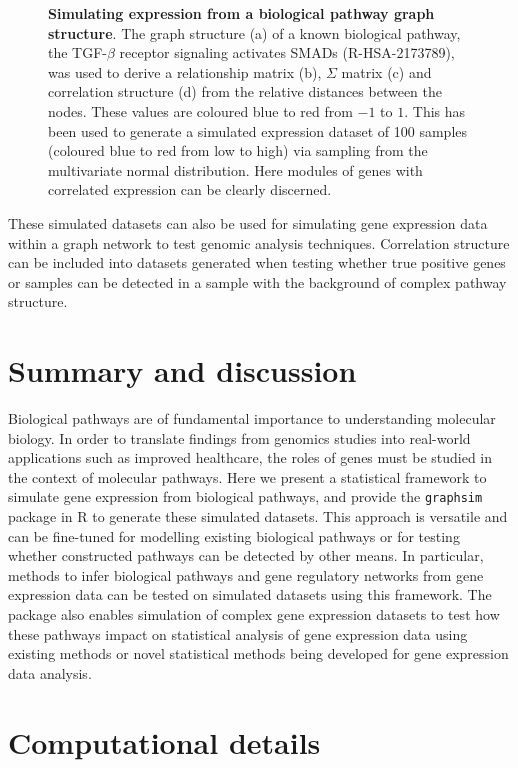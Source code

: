 \documentclass[]{article}
\begin{document}
\begin{figure}
{}

\caption{\textbf{Simulating expression from a biological pathway graph structure}. The graph structure (a) of a known biological pathway, the TGF-$\beta$ receptor signaling activates SMADs (R-HSA-2173789), was used to derive a relationship matrix (b), $\Sigma$ matrix (c) and correlation structure (d) from the relative distances between the nodes. These values are coloured blue to red from $-1$ to $1$. This has been used to generate a simulated expression dataset of 100 samples (coloured blue to red from low to high) via sampling from the multivariate normal distribution. Here modules of genes with correlated expression can be clearly discerned.}\label{fig:simulation_smad}
\end{figure}

These simulated datasets can also be used for simulating gene expression
data within a graph network to test genomic analysis techniques.
Correlation structure can be included into datasets generated when
testing whether true positive genes or samples can be detected in a
sample with the background of complex pathway structure.

\hypertarget{sec:summary}{%
\section{Summary and discussion}\label{sec:summary}}

Biological pathways are of fundamental importance to understanding
molecular biology. In order to translate findings from genomics studies
into real-world applications such as improved healthcare, the roles of
genes must be studied in the context of molecular pathways. Here we
present a statistical framework to simulate gene expression from
biological pathways, and provide the \texttt{graphsim} package in R to
generate these simulated datasets. This approach is versatile and can be
fine-tuned for modelling existing biological pathways or for testing
whether constructed pathways can be detected by other means. In
particular, methods to infer biological pathways and gene regulatory
networks from gene expression data can be tested on simulated datasets
using this framework. The package also enables simulation of complex
gene expression datasets to test how these pathways impact on
statistical analysis of gene expression data using existing methods or
novel statistical methods being developed for gene expression data
analysis.

\hypertarget{computational-details}{%
\section*{Computational details}\label{computational-details}}
\end{document}
